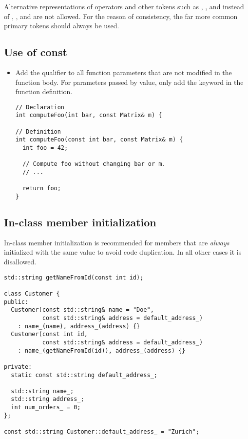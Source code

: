 Alternative representations of operators and other tokens such as , , and  instead of \inlinecode{&&}, \inlinecode{||}, and \inlinecode{!} are not allowed.
For the reason of consistency, the far more common primary tokens should always be used.

\subsection{Use of const}

\begin{itemize}

\item Add the  qualifier to all function parameters that are not modified in the function body.
For parameters passed by value, only add the keyword in the function definition.

\begin{lstlisting}[showspaces=false]
// Declaration
int computeFoo(int bar, const Matrix& m) {

// Definition
int computeFoo(const int bar, const Matrix& m) {
  int foo = 42;

  // Compute foo without changing bar or m.
  // ...
	
  return foo;
}
\end{lstlisting}

\end{itemize}

\subsection{In-class member initialization}

In-class member initialization is recommended for members that are \emph{always} initialized with the same value to avoid code duplication.
In all other cases it is disallowed.

\begin{lstlisting}[showspaces=false]
std::string getNameFromId(const int id);

class Customer {
public:
  Customer(const std::string& name = "Doe",
           const std::string& address = default_address_)
    : name_(name), address_(address) {}
  Customer(const int id,
           const std::string& address = default_address_)
    : name_(getNameFromId(id)), address_(address) {}

private:
  static const std::string default_address_;

  std::string name_;
  std::string address_;
  int num_orders_ = 0;
};

const std::string Customer::default_address_ = "Zurich";
\end{lstlisting}
